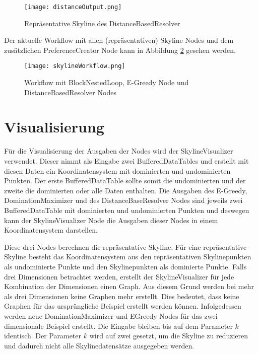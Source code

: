 \begin{figure}[H]
	\centering
	\texttt{[image: distanceOutput.png]}
	\caption{Repräsentative Skyline des DistanceBasedResolver}
	\label{img:distanceOutput}
\end{figure} 

Der aktuelle Workflow mit allen (repräsentativen) Skyline Nodes und dem zusätzlichen PreferenceCreator Node kann in Abbildung \ref{img:skylineWorkflow} gesehen werden.

\begin{figure}[H]
	\centering
	\texttt{[image: skylineWorkflow.png]}
	\caption{Workflow mit BlockNestedLoop, E-Greedy Node und DistanceBasedResolver Nodes}
	\label{img:skylineWorkflow}
\end{figure} 
\section{Visualisierung}
\label{ch:Evaluierung:sec:visualize}
Für die Visualisierung der Ausgaben der Nodes wird der SkylineVisualizer verwendet. Dieser nimmt als Eingabe zwei BufferedDataTables und erstellt mit diesen Daten ein Koordinatensystem mit dominierten und undominierten Punkten. Der erste BufferedDataTable sollte somit die undominierten und der zweite die dominierten oder alle Daten enthalten. Die Ausgaben des E-Greedy, DominationMaximizer und des DistanceBaseResolver Nodes sind jeweils zwei BufferedDataTable mit dominierten und undominierten Punkten und deswegen kann der SkylineVisualizer Node die Ausgaben dieser Nodes in einem Koordinatensystem darstellen.

Diese drei Nodes berechnen die repräsentative Skyline. Für eine repräsentative Skyline besteht das Koordinatensystem aus den repräsentativen Skylinepunkten als undominierte Punkte und den Skylinepunkten als dominierte Punkte. Falls drei Dimensionen betrachtet werden, erstellt der SkylineVisualizer für jede Kombination der Dimensionen einen Graph. Aus diesem Grund werden bei mehr als drei Dimensionen keine Graphen mehr erstellt. Dies bedeutet, dass keine Graphen für das ursprüngliche Beispiel erstellt werden können. Infolgedessen werden neue DominationMaximizer und EGreedy Nodes für das zwei dimensionale Beispiel erstellt. Die Eingabe bleiben bis auf dem Parameter $k$ identisch. Der Parameter $k$ wird auf zwei gesetzt, um die Skyline zu reduzieren und dadurch nicht alle Skylinedatensätze ausgegeben werden. 

